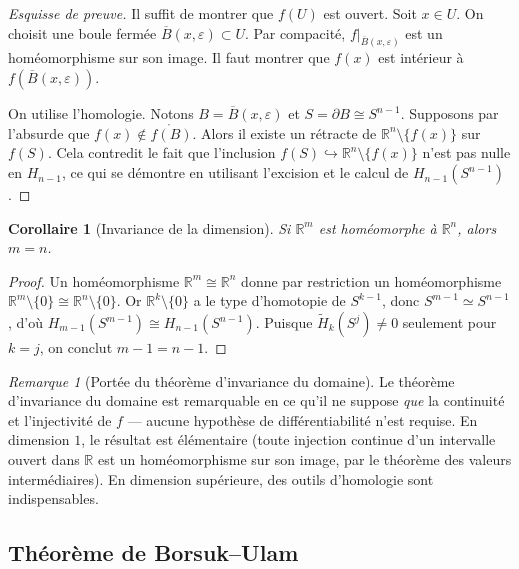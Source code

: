 \documentclass[12pt,a4paper,openany]{book}
\theoremstyle{definition}
\theoremstyle{plain}
\newtheorem{corollaire}[definition]{Corollaire}
\theoremstyle{remark}
\newtheorem{remarque}[definition]{Remarque}
\newcommand{\R}{\mathbb{R}}
\begin{document}
\begin{proof}[Esquisse de preuve]
Il suffit de montrer que $f(U)$ est ouvert. Soit $x \in U$. On choisit une boule fermée
$\overline{B}(x, \varepsilon) \subset U$. Par compacité, $f|_{\overline{B}(x,\varepsilon)}$
est un homéomorphisme sur son image. Il faut montrer que $f(x)$ est intérieur à $f(\overline{B}(x,\varepsilon))$.

On utilise l'homologie. Notons $B = \overline{B}(x,\varepsilon)$ et $S = \partial B \cong S^{n-1}$.
Supposons par l'absurde que $f(x) \notin \mathring{f(B)}$. Alors il existe un rétracte de
$\R^n \setminus \{f(x)\}$ sur $f(S)$. Cela contredit le fait que l'inclusion
$f(S) \hookrightarrow \R^n \setminus \{f(x)\}$ n'est pas nulle en $H_{n-1}$, ce qui se
démontre en utilisant l'excision et le calcul de $H_{n-1}(S^{n-1})$.
\end{proof}

\begin{corollaire}[Invariance de la dimension]\label{cor:invariance-dimension}
Si $\R^m$ est homéomorphe à $\R^n$, alors $m = n$.
\end{corollaire}

\begin{proof}
Un homéomorphisme $\R^m \cong \R^n$ donne par restriction un homéomorphisme $\R^m \setminus \{0\} \cong \R^n \setminus \{0\}$. Or $\R^k \setminus \{0\}$ a le type d'homotopie de $S^{k-1}$,
donc $S^{m-1} \simeq S^{n-1}$, d'où $H_{m-1}(S^{m-1}) \cong H_{n-1}(S^{n-1})$.
Puisque $\widetilde{H}_k(S^j) \neq 0$ seulement pour $k = j$, on conclut $m - 1 = n - 1$.
\end{proof}

\begin{remarque}[Portée du théorème d'invariance du domaine]\label{rem:portee-invariance}
Le théorème d'invariance du domaine est remarquable en ce qu'il ne suppose \emph{que} la
continuité et l'injectivité de $f$ --- aucune hypothèse de différentiabilité n'est requise.
En dimension $1$, le résultat est élémentaire (toute injection continue d'un intervalle
ouvert dans $\R$ est un homéomorphisme sur son image, par le théorème des valeurs intermédiaires).
En dimension supérieure, des outils d'homologie sont indispensables.
\end{remarque}

\subsection{Théorème de Borsuk--Ulam}\label{subsec:borsuk-ulam}
\end{document}
